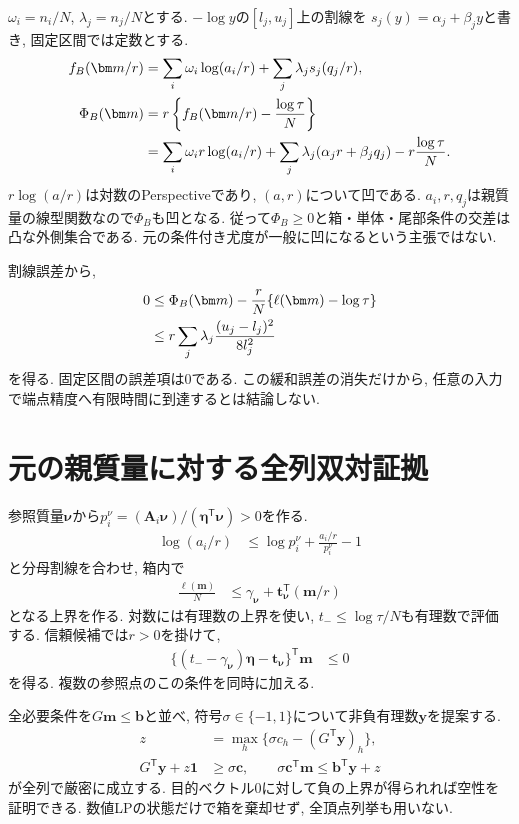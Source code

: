 $\omega_i=n_i/N$, $\lambda_j=n_j/N$とする.
$-\log y$の$[l_j,u_j]$上の割線を
$s_j(y)=\alpha_j+\beta_jy$と書き, 固定区間では定数とする.
\begin{align}
f_B(\bm m/r)
&=\sum_i\omega_i\log(a_i/r)
+\sum_j\lambda_js_j(q_j/r),
\label{eq:stage21_relative_majorant}\\
\Phi_B(\bm m)
&=r\left\{f_B(\bm m/r)-\frac{\log\tau}{N}\right\}
\notag\\
&=\sum_i\omega_ir\log(a_i/r)
+\sum_j\lambda_j(\alpha_jr+\beta_jq_j)
-r\frac{\log\tau}{N}.
\label{eq:stage21_perspective_majorant}
\end{align}
$r\log(a/r)$は対数のPerspectiveであり, $(a,r)$について凹である.
$a_i,r,q_j$は親質量の線型関数なので$\Phi_B$も凹となる.
従って$\Phi_B\ge0$と箱・単体・尾部条件の交差は凸な外側集合である.
元の条件付き尤度が一般に凹になるという主張ではない.

割線誤差から,
\begin{align}
0&\le\Phi_B(\bm m)-\frac{r}{N}\{\ell(\bm m)-\log\tau\}
\notag\\
&\le r\sum_j\lambda_j\frac{(u_j-l_j)^2}{8l_j^2}
\label{eq:stage21_secant_error}
\end{align}
を得る. 固定区間の誤差項は0である.
この緩和誤差の消失だけから,
任意の入力で端点精度へ有限時間に到達するとは結論しない.

\section{元の親質量に対する全列双対証拠}
\label{sec:stage21_certificates}

参照質量$\bm\nu$から$p_i^\nu=(\bm A_i\bm\nu)/(\bm\eta^{\mathsf T}\bm\nu)>0$を作る.
\begin{align}
\log(a_i/r)&\le\log p_i^\nu+\frac{a_i/r}{p_i^\nu}-1
\label{eq:stage21_log_tangent}
\end{align}
と分母割線を合わせ, 箱内で
\begin{align}
\frac{\ell(\bm m)}N
&\le\gamma_{\bm\nu}+\bm t_{\bm\nu}^{\mathsf T}(\bm m/r)
\label{eq:stage21_affine_scaled}
\end{align}
となる上界を作る.
対数には有理数の上界を使い, $t_-\le\log\tau/N$も有理数で評価する.
信頼候補では$r>0$を掛けて,
\begin{align}
\{(t_--\gamma_{\bm\nu})\bm\eta-\bm t_{\bm\nu}\}^{\mathsf T}\bm m
&\le0
\label{eq:stage21_homogeneous_cut}
\end{align}
を得る. 複数の参照点のこの条件を同時に加える.

全必要条件を$G\bm m\le\bm b$と並べ,
符号$\sigma\in\{-1,1\}$について非負有理数$\bm y$を提案する.
\begin{align}
z&=\max_h\{\sigma c_h-(G^{\mathsf T}\bm y)_h\},
\label{eq:stage21_dual_completion}\\
G^{\mathsf T}\bm y+z\bm1&\ge\sigma\bm c,\qquad
\sigma\bm c^{\mathsf T}\bm m\le\bm b^{\mathsf T}\bm y+z
\label{eq:stage21_column_bound}
\end{align}
が全列で厳密に成立する.
目的ベクトル0に対して負の上界が得られれば空性を証明できる.
数値LPの状態だけで箱を棄却せず, 全頂点列挙も用いない.

